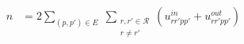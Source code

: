 \begin{align}
n &= 2 \sum_{(p,p')\in E}\;
\sum_{\substack{r,r' \in \mathcal{R}\\ r \neq r'}}
\left( u^{in}_{rr'pp'} + u^{out}_{rr'pp'} \right)
&&
\end{align}





    


